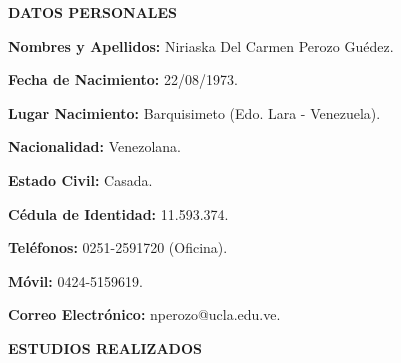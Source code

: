 %
%
%


\noindent\textbf{DATOS PERSONALES}

\espaciodoble

\textbf{Nombres y Apellidos:} Niriaska Del Carmen Perozo Guédez.

\textbf{Fecha de Nacimiento:}  22/08/1973.

\textbf{Lugar Nacimiento:} Barquisimeto (Edo. Lara - Venezuela).

\textbf{Nacionalidad:} Venezolana.

\textbf{Estado Civil:} Casada.

\textbf{Cédula de Identidad:} 11.593.374.

\textbf{Teléfonos:} 0251-2591720 (Oficina).

\textbf{Móvil:} 0424-5159619.

\textbf{Correo Electrónico:} nperozo@ucla.edu.ve.

\espaciotriple

\noindent\textbf{ESTUDIOS REALIZADOS}


